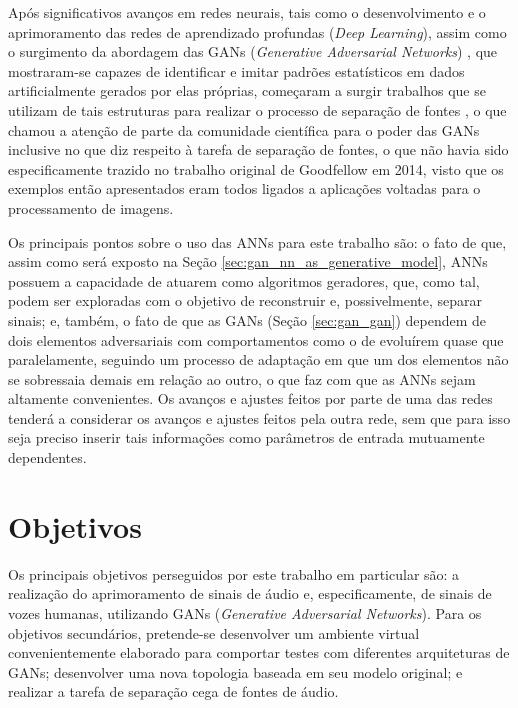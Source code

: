 Após significativos avanços em redes neurais, tais como o desenvolvimento e o aprimoramento das redes de aprendizado profundas (\textit{Deep Learning}), assim como o surgimento da abordagem das GANs (\textit{Generative Adversarial Networks}) \citep{NIPS2014_5423}, que mostraram-se capazes de identificar e imitar padrões estatísticos em dados artificialmente gerados por elas próprias, começaram a surgir trabalhos que se utilizam de tais estruturas para realizar o processo de separação de fontes \citep{8461671, kaneko2018generative, fan2018svsgan}, o que chamou a atenção de parte da comunidade científica para o poder das GANs inclusive no que diz respeito à tarefa de separação de fontes, o que não havia sido especificamente trazido no trabalho original de Goodfellow em 2014, visto que os exemplos então apresentados eram todos ligados a aplicações voltadas para o processamento de imagens.

Os principais pontos sobre o uso das ANNs para este trabalho são: o fato de que, assim como será exposto na Seção \ref{sec:gan_nn_as_generative_model}, ANNs possuem a capacidade de atuarem como algoritmos geradores, que, como tal, podem ser exploradas com o objetivo de reconstruir e, possivelmente, separar sinais; e, também, o fato de que as GANs (Seção \ref{sec:gan_gan}) dependem de dois elementos adversariais com comportamentos como o de evoluírem quase que paralelamente, seguindo um processo de adaptação em que um dos elementos não se sobressaia demais em relação ao outro, o que faz com que as ANNs sejam altamente convenientes. Os avanços e ajustes feitos por parte de uma das redes tenderá a considerar os avanços e ajustes feitos pela outra rede, sem que para isso seja preciso inserir tais informações como parâmetros de entrada mutuamente dependentes.


\section{Objetivos}
\label{sec:intro_objectives}

Os principais objetivos perseguidos por este trabalho em particular são: a realização do aprimoramento de sinais de áudio e, especificamente, de sinais de vozes humanas, utilizando GANs (\textit{Generative Adversarial Networks}). Para os objetivos secundários, pretende-se desenvolver um ambiente virtual convenientemente elaborado para comportar testes com diferentes arquiteturas de GANs; desenvolver uma nova topologia baseada em seu modelo original; e realizar a tarefa de separação cega de fontes de áudio.


